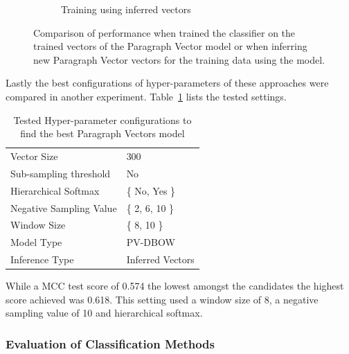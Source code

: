 \begin{figure}[h]
\begin{subfigure}[b]{0.49\textwidth}
    \caption{Training using inferred vectors}
\label{fig:doc2vec_training_inferred}
    \end{subfigure}
\caption{Comparison of performance when trained the classifier on the trained vectors of the Paragraph Vector model or when inferring new Paragraph Vector vectors for the training data using the model.}
\label{fig:doc2vec_training}
\end{figure}

Lastly the best configurations of hyper-parameters of these approaches were compared in another experiment. Table~\ref{tab:Paragraph Vector Best Configurations Search} lists the tested settings.

\begin{table}[h]
  \begin{center}
  \begin{tabular}{ l | l }
    \toprule
    Vector Size & 300 \\
    Sub-sampling threshold & No \\
    Hierarchical Softmax & \{ No, Yes \} \\
    Negative Sampling Value & \{ 2, 6, 10 \} \\
    Window Size & \{ 8, 10 \} \\
    Model Type & PV-DBOW \\
    Inference Type & Inferred Vectors \\
    \bottomrule
  \end{tabular}
  \caption{Tested Hyper-parameter configurations to find the best Paragraph Vectors model}
  \label{tab:Paragraph Vector Best Configurations Search}
\end{center}
\end{table}

While a \gls{MCC} test score of 0.574 the lowest amongst the candidates the highest score achieved was 0.618. This setting used a window size of 8, a negative sampling value of 10 and hierarchical softmax.

\clearpage

\subsubsection{Evaluation of Classification Methods}
\label{subs:Evaluation of Classification Methods}


